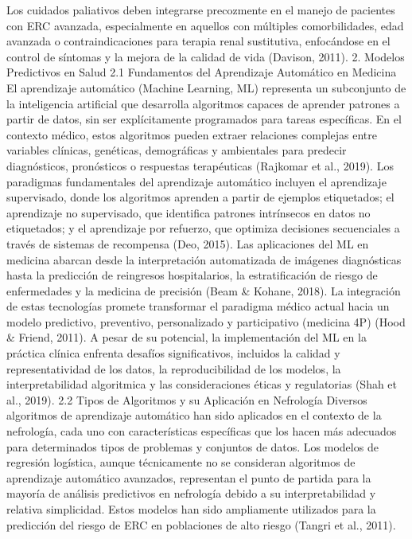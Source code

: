\documentclass{article}
\begin{document}
\begin{multicols}{2}
Los cuidados paliativos deben integrarse precozmente en el manejo de pacientes con ERC avanzada, especialmente en aquellos con múltiples comorbilidades, edad avanzada o contraindicaciones para terapia renal sustitutiva, enfocándose en el control de síntomas y la mejora de la calidad de vida (Davison, 2011).
 2. Modelos Predictivos en Salud
 2.1 Fundamentos del Aprendizaje Automático en Medicina
El aprendizaje automático (Machine Learning, ML) representa un subconjunto de la inteligencia artificial que desarrolla algoritmos capaces de aprender patrones a partir de datos, sin ser explícitamente programados para tareas específicas. En el contexto médico, estos algoritmos pueden extraer relaciones complejas entre variables clínicas, genéticas, demográficas y ambientales para predecir diagnósticos, pronósticos o respuestas terapéuticas (Rajkomar et al., 2019).
Los paradigmas fundamentales del aprendizaje automático incluyen el aprendizaje supervisado, donde los algoritmos aprenden a partir de ejemplos etiquetados; el aprendizaje no supervisado, que identifica patrones intrínsecos en datos no etiquetados; y el aprendizaje por refuerzo, que optimiza decisiones secuenciales a través de sistemas de recompensa (Deo, 2015).
Las aplicaciones del ML en medicina abarcan desde la interpretación automatizada de imágenes diagnósticas hasta la predicción de reingresos hospitalarios, la estratificación de riesgo de enfermedades y la medicina de precisión (Beam \& Kohane, 2018). La integración de estas tecnologías promete transformar el paradigma médico actual hacia un modelo predictivo, preventivo, personalizado y participativo (medicina 4P) (Hood \& Friend, 2011).
A pesar de su potencial, la implementación del ML en la práctica clínica enfrenta desafíos significativos, incluidos la calidad y representatividad de los datos, la reproducibilidad de los modelos, la interpretabilidad algoritmica y las consideraciones éticas y regulatorias (Shah et al., 2019).
 2.2 Tipos de Algoritmos y su Aplicación en Nefrología
Diversos algoritmos de aprendizaje automático han sido aplicados en el contexto de la nefrología, cada uno con características específicas que los hacen más adecuados para determinados tipos de problemas y conjuntos de datos.
Los modelos de regresión logística, aunque técnicamente no se consideran algoritmos de aprendizaje automático avanzados, representan el punto de partida para la mayoría de análisis predictivos en nefrología debido a su interpretabilidad y relativa simplicidad. Estos modelos han sido ampliamente utilizados para la predicción del riesgo de ERC en poblaciones de alto riesgo (Tangri et al., 2011).

\end{multicols}
\end{document}

